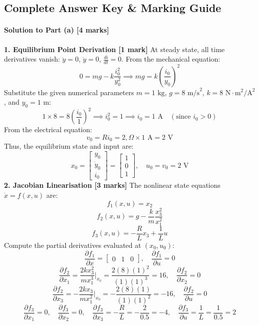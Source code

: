 \documentclass[12pt,onecolumn,twoside ]{article}
\begin{document}
	\subsection{Complete Answer Key \& Marking Guide}
	\paragraph{Solution to Part (a) [4 marks]}
	\textbf{1. Equilibrium Point Derivation [1 mark]} At steady state, all time derivatives vanish: $\ddot{y} = 0$, $\dot{y} = 0$, $\frac{di}{dt} = 0$. From the mechanical equation: \[
	0 = mg - k \frac{i_0^2}{y_0^2} \implies mg = k \left(\frac{i_0}{y_0}\right)^2
	\] Substitute the given numerical parameters $m = 1\text{ kg}$, $g = 8\text{ m/s}^2$, $k = 8\text{ N}\cdot\text{m}^2/\text{A}^2$, and $y_0 = 1\text{ m}$: \[
	1 \times 8 = 8 \left(\frac{i_0}{1}\right)^2 \implies i_0^2 = 1 \implies i_0 = 1\text{ A} \quad (\text{since } i_0 > 0)
	\] From the electrical equation: \[
	v_0 = R i_0 = 2,\Omega \times 1\text{ A} = 2\text{ V}
	\] Thus, the equilibrium state and input are: \[
	x_0 = \begin{bmatrix} y_0 \\ \dot{y}_0 \\ i_0 \end{bmatrix} = \begin{bmatrix} 1 \\ 0 \\ 1 \end{bmatrix}, \quad u_0 = v_0 = 2\text{ V}
	\]
	\textbf{2. Jacobian Linearisation [3 marks]} The nonlinear state equations $\dot{x} = f(x, u)$ are: \[
	f_1(x, u) = x_2
	\] \[
	f_2(x, u) = g - \frac{k}{m} \frac{x_3^2}{x_1^2}
	\] \[
	f_3(x, u) = -\frac{R}{L} x_3 + \frac{1}{L} u
	\]
	Compute the partial derivatives evaluated at $(x_0, u_0)$: \[
	\frac{\partial f_1}{\partial x} = \begin{bmatrix} 0 & 1 & 0 \end{bmatrix}, \quad \frac{\partial f_1}{\partial u} = 0
	\] \[
	\frac{\partial f_2}{\partial x_1} = \frac{2k x_3^2}{m x_1^3}\Bigg|_{x_0} = \frac{2(8)(1)^2}{(1)(1)^3} = 16, \quad \frac{\partial f_2}{\partial x_2} = 0
	\] \[
	\frac{\partial f_2}{\partial x_3} = -\frac{2k x_3}{m x_1^2}\Bigg|_{x_0} = -\frac{2(8)(1)}{(1)(1)^2} = -16, \quad \frac{\partial f_2}{\partial u} = 0
	\] \[
	\frac{\partial f_3}{\partial x_1} = 0, \quad \frac{\partial f_3}{\partial x_2} = 0, \quad \frac{\partial f_3}{\partial x_3} = -\frac{R}{L} = -\frac{2}{0.5} = -4, \quad \frac{\partial f_3}{\partial u} = \frac{1}{L} = \frac{1}{0.5} = 2
	\]
\end{document}
